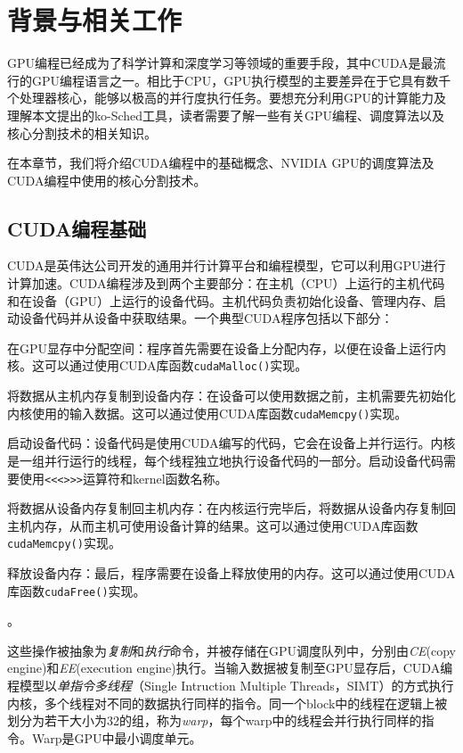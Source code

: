 \chapter{背景与相关工作}\label{background}

GPU编程已经成为了科学计算和深度学习等领域的重要手段，其中CUDA是最流行的GPU编程语言之一。相比于CPU，GPU执行模型的主要差异在于它具有数千个处理器核心，能够以极高的并行度执行任务。要想充分利用GPU的计算能力及理解本文提出的ko-Sched工具，读者需要了解一些有关GPU编程、调度算法以及核心分割技术的相关知识。

在本章节，我们将介绍CUDA编程中的基础概念、NVIDIA GPU的调度算法及CUDA编程中使用的核心分割技术。

\section{CUDA编程基础}

CUDA是英伟达公司开发的通用并行计算平台和编程模型，它可以利用GPU进行计算加速。CUDA编程涉及到两个主要部分：在主机（CPU）上运行的主机代码和在设备（GPU）上运行的设备代码。主机代码负责初始化设备、管理内存、启动设备代码并从设备中获取结果。一个典型CUDA程序包括以下部分：
\begin{enumerate*}[label=\roman*),itemjoin={\quad}]
    \item 在GPU显存中分配空间：程序首先需要在设备上分配内存，以便在设备上运行内核。这可以通过使用CUDA库函数\texttt{cudaMalloc()}实现。
    \item 将数据从主机内存复制到设备内存：在设备可以使用数据之前，主机需要先初始化内核使用的输入数据。这可以通过使用CUDA库函数\texttt{cudaMemcpy()}实现。
    \item 启动设备代码：设备代码是使用CUDA编写的代码，它会在设备上并行运行。内核是一组并行运行的线程，每个线程独立地执行设备代码的一部分。启动设备代码需要使用\texttt{<<<>>>}运算符和kernel函数名称。
    \item 将数据从设备内存复制回主机内存：在内核运行完毕后，将数据从设备内存复制回主机内存，从而主机可使用设备计算的结果。这可以通过使用CUDA库函数\texttt{cudaMemcpy()}实现。
    \item 释放设备内存：最后，程序需要在设备上释放使用的内存。这可以通过使用CUDA库函数\texttt{cudaFree()}实现。
\end{enumerate*}。

这些操作被抽象为\emph{复制}和\emph{执行}命令，并被存储在GPU调度队列中，分别由\emph{CE}(copy engine)和\emph{EE}(execution engine)执行。当输入数据被复制至GPU显存后，CUDA编程模型以\emph{单指令多线程}（Single Intruction Multiple Threads，SIMT）的方式执行内核，多个线程对不同的数据执行同样的指令。同一个block中的线程在逻辑上被划分为若干大小为32的组，称为\emph{warp}，每个warp中的线程会并行执行同样的指令。Warp是GPU中最小调度单元。

